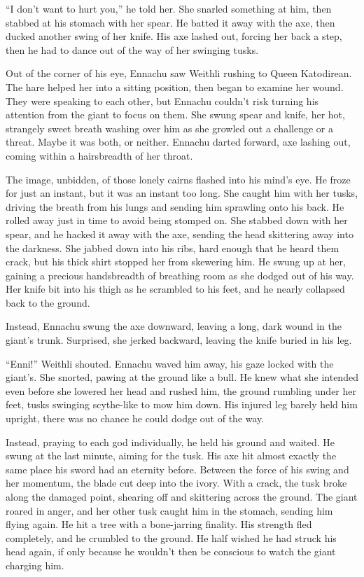 ``I don't want to hurt you,'' he told her. She snarled something at him, then stabbed at his stomach with her spear. He batted it away with the axe, then ducked another swing of her knife. His axe lashed out, forcing her back a step, then he had to dance out of the way of her swinging tusks.

Out of the corner of his eye, Ennachu saw Weithli rushing to Queen Katodirean. The hare helped her into a sitting position, then began to examine her wound. They were speaking to each other, but Ennachu couldn't risk turning his attention from the giant to focus on them. She swung spear and knife, her hot, strangely sweet breath washing over him as she growled out a challenge or a threat. Maybe it was both, or neither. Ennachu darted forward, axe lashing out, coming within a hairsbreadth of her throat.

The image, unbidden, of those lonely cairns flashed into his mind's eye. He froze for just an instant, but it was an instant too long. She caught him with her tusks, driving the breath from his lungs and sending him sprawling onto his back. He rolled away just in time to avoid being stomped on. She stabbed down with her spear, and he hacked it away with the axe, sending the head skittering away into the darkness. She jabbed down into his ribs, hard enough that he heard them crack, but his thick shirt stopped her from skewering him. He swung up at her, gaining a precious handsbreadth of breathing room as she dodged out of his way. Her knife bit into his thigh as he scrambled to his feet, and he nearly collapsed back to the ground.

Instead, Ennachu swung the axe downward, leaving a long, dark wound in the giant's trunk. Surprised, she jerked backward, leaving the knife buried in his leg.

``Enni!'' Weithli shouted. Ennachu waved him away, his gaze locked with the giant's. She snorted, pawing at the ground like a bull. He knew what she intended even before she lowered her head and rushed him, the ground rumbling under her feet, tusks swinging scythe-like to mow him down. His injured leg barely held him upright, there was no chance he could dodge out of the way.

Instead, praying to each god individually, he held his ground and waited. He swung at the last minute, aiming for the tusk. His axe hit almost exactly the same place his sword had an eternity before. Between the force of his swing and her momentum, the blade cut deep into the ivory. With a crack, the tusk broke along the damaged point, shearing off and skittering across the ground. The giant roared in anger, and her other tusk caught him in the stomach, sending him flying again. He hit a tree with a bone-jarring finality. His strength fled completely, and he crumbled to the ground. He half wished he had struck his head again, if only because he wouldn't then be conscious to watch the giant charging him.

